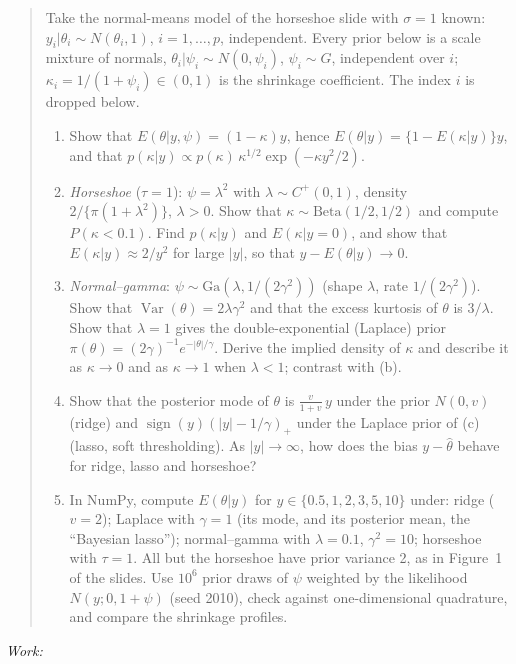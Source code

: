 \documentclass[11pt,a4paper]{article}
\newif\ifsolucoes
\newcommand{\espacoresol}{4.5cm}   %
\newenvironment{enunciado}{\begin{quote}}{\end{quote}}
\newcommand{\resolespaco}{\ifsolucoes\else\par\textit{Work:}\vspace{\espacoresol}\par\fi}
\begin{document}
\begin{enunciado}
Take the normal-means model of the horseshoe slide with $\sigma=1$ known: $y_i|\theta_i\sim N(\theta_i,1)$, $i=1,\ldots,p$, independent. Every prior below is a scale mixture of normals, $\theta_i|\psi_i\sim N(0,\psi_i)$, $\psi_i\sim G$, independent over $i$; $\kappa_i=1/(1+\psi_i)\in(0,1)$ is the shrinkage coefficient. The index $i$ is dropped below.
\begin{enumerate}[label=\textbf{(\alph*)},leftmargin=2em]
\item Show that $E(\theta|y,\psi)=(1-\kappa)y$, hence $E(\theta|y)=\{1-E(\kappa|y)\}y$, and that $p(\kappa|y)\propto p(\kappa)\,\kappa^{1/2}\exp(-\kappa y^2/2)$.
\item \emph{Horseshoe} ($\tau=1$): $\psi=\lambda^2$ with $\lambda\sim C^+(0,1)$, density $2/\{\pi(1+\lambda^2)\}$, $\lambda>0$. Show that $\kappa\sim\text{Beta}(1/2,1/2)$ and compute $P(\kappa<0.1)$. Find $p(\kappa|y)$ and $E(\kappa|y=0)$, and show that $E(\kappa|y)\approx2/y^2$ for large $|y|$, so that $y-E(\theta|y)\to0$.
\item \emph{Normal--gamma}: $\psi\sim\text{Ga}(\lambda,1/(2\gamma^2))$ (shape $\lambda$, rate $1/(2\gamma^2)$). Show that $\operatorname{Var}(\theta)=2\lambda\gamma^2$ and that the excess kurtosis of $\theta$ is $3/\lambda$. Show that $\lambda=1$ gives the double-exponential (Laplace) prior $\pi(\theta)=(2\gamma)^{-1}e^{-|\theta|/\gamma}$. Derive the implied density of $\kappa$ and describe it as $\kappa\to0$ and as $\kappa\to1$ when $\lambda<1$; contrast with (b).
\item Show that the posterior mode of $\theta$ is $\frac{v}{1+v}\,y$ under the prior $N(0,v)$ (ridge) and $\operatorname{sign}(y)(|y|-1/\gamma)_+$ under the Laplace prior of (c) (lasso, soft thresholding). As $|y|\to\infty$, how does the bias $y-\hat\theta$ behave for ridge, lasso and horseshoe?
\item In NumPy, compute $E(\theta|y)$ for $y\in\{0.5,1,2,3,5,10\}$ under: ridge ($v=2$); Laplace with $\gamma=1$ (its mode, and its posterior mean, the ``Bayesian lasso''); normal--gamma with $\lambda=0.1$, $\gamma^2=10$; horseshoe with $\tau=1$. All but the horseshoe have prior variance 2, as in Figure~1 of the slides. Use $10^6$ prior draws of $\psi$ weighted by the likelihood $N(y;0,1+\psi)$ (seed 2010), check against one-dimensional quadrature, and compare the shrinkage profiles.
\end{enumerate}
\end{enunciado}
\resolespaco
\end{document}
